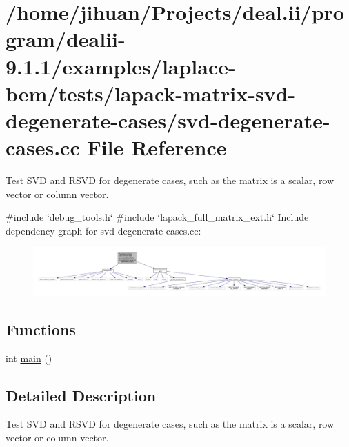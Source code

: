 \hypertarget{svd-degenerate-cases_8cc}{}\section{/home/jihuan/\+Projects/deal.ii/program/dealii-\/9.1.1/examples/laplace-\/bem/tests/lapack-\/matrix-\/svd-\/degenerate-\/cases/svd-\/degenerate-\/cases.cc File Reference}
\label{svd-degenerate-cases_8cc}


Test S\+VD and R\+S\+VD for degenerate cases, such as the matrix is a scalar, row vector or column vector.  


{\ttfamily \#include \char`\"{}debug\+\_\+tools.\+h\char`\"{}}\newline
{\ttfamily \#include \char`\"{}lapack\+\_\+full\+\_\+matrix\+\_\+ext.\+h\char`\"{}}\newline
Include dependency graph for svd-\/degenerate-\/cases.cc\+:\nopagebreak
\begin{figure}[H]
\begin{center}
\leavevmode
\includegraphics[width=350pt]{svd-degenerate-cases_8cc__incl}
\end{center}
\end{figure}
\subsection*{Functions}
\begin{DoxyCompactItemize}
\item 
int \hyperlink{svd-degenerate-cases_8cc_ae66f6b31b5ad750f1fe042a706a4e3d4}{main} ()
\end{DoxyCompactItemize}


\subsection{Detailed Description}
Test S\+VD and R\+S\+VD for degenerate cases, such as the matrix is a scalar, row vector or column vector. 

